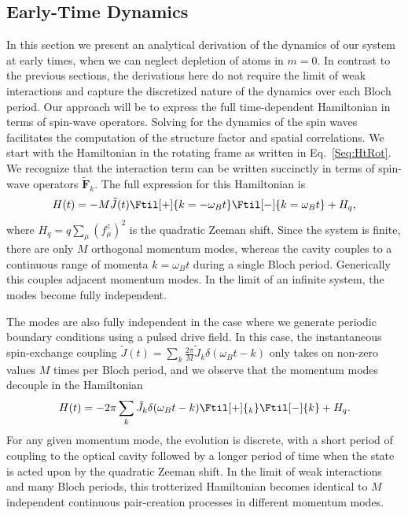 \begin{bibunit}
\subsection{Early-Time Dynamics}
\label{sec:EarlyDynamics}
In this section we present an analytical derivation of the dynamics of our system at early times, when we can neglect depletion of atoms in $m=0$. In contrast to the previous sections, the derivations here do not require the limit of weak interactions and capture the discretized nature of the dynamics over each Bloch period. Our approach will be to express the full time-dependent Hamiltonian in terms of spin-wave operators. Solving for the dynamics of the spin waves facilitates the computation of the structure factor and spatial correlations.
We start with the Hamiltonian in the rotating frame as written in Eq.~\eqref{Seq:HtRot}. We recognize that the interaction term can be written succinctly in terms of spin-wave operators $\tilde{\mathbf{F}}_k$. The full expression for this Hamiltonian is
\begin{equation}
H(t) = -M \tilde{J}(t) \Ftil[+]{k=-\omega_B t} \Ftil[-]{k=\omega_B t} + H_q,
\end{equation}
where $H_q = q \sum_\mu (f^z_\mu)^2$ is the quadratic Zeeman shift. 
Since the system is finite, there are only $M$ orthogonal momentum modes, whereas the cavity couples to a continuous range of momenta $k=\omega_B t$ during a single Bloch period. Generically this couples adjacent momentum modes. In the limit of an infinite system, the modes become fully independent.

The modes are also fully independent in the case where we generate periodic boundary conditions using a pulsed drive field.  In this case, the instantaneous spin-exchange coupling $\tilde{J}(t) = \sum_k \frac{2\pi}{M} \tilde{J}_k \delta(\omega_Bt-k)$ only takes on non-zero values $M$ times per Bloch period, and we observe that the momentum modes decouple in the Hamiltonian
\begin{equation}
H(t) = -2\pi \sum_k \tilde{J}_k \delta(\omega_Bt-k) \Ftil[+]{_k} \Ftil[-]{k} + H_q.
\label{Seq:PulsedH}
\end{equation}
For any given momentum mode, the evolution is discrete, with a short period of coupling to the optical cavity followed by a longer period of time when the state is acted upon by the quadratic Zeeman shift. In the limit of weak interactions and many Bloch periods, this trotterized Hamiltonian becomes identical to $M$ independent continuous pair-creation processes in different momentum modes. 


\end{bibunit}
